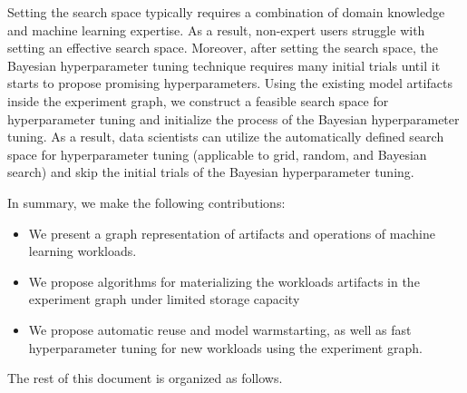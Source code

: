 Setting the search space typically requires a combination of domain knowledge and machine learning expertise.
As a result, non-expert users struggle with setting an effective search space.
Moreover, after setting the search space, the Bayesian hyperparameter tuning technique requires many initial trials until it starts to propose promising hyperparameters.
Using the existing model artifacts inside the experiment graph, we construct a feasible search space for hyperparameter tuning and initialize the process of the Bayesian hyperparameter tuning.
As a result, data scientists can utilize the automatically defined search space for hyperparameter tuning (applicable to grid, random, and Bayesian search) and skip the initial trials of the Bayesian hyperparameter tuning.

In summary, we make the following contributions:
\begin{itemize}
\item We present a graph representation of artifacts and operations of machine learning workloads.
\item We propose algorithms for materializing the workloads artifacts in the experiment graph under limited storage capacity
\item We propose automatic reuse and model warmstarting, as well as fast hyperparameter tuning for new workloads using the experiment graph.
\end{itemize}

The rest of this document is organized as follows.